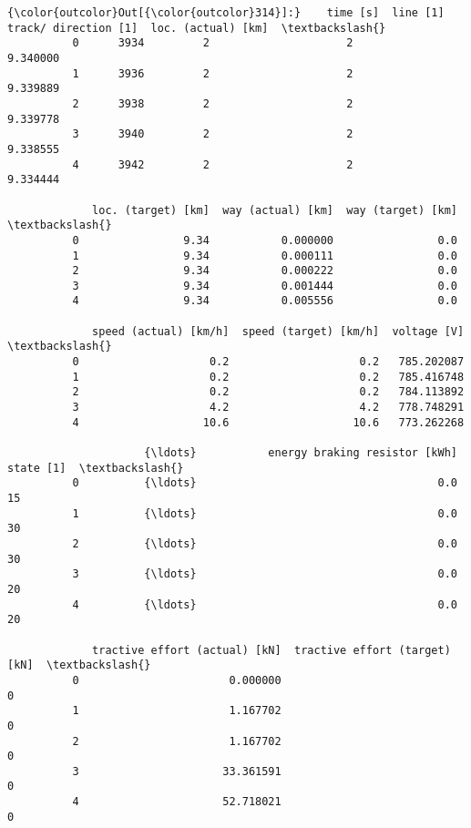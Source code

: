 \documentclass[11pt]{article}
\begin{document}
\begin{Verbatim}[commandchars=\\\{\}]
{\color{outcolor}Out[{\color{outcolor}314}]:}    time [s]  line [1]  track/ direction [1]  loc. (actual) [km]  \textbackslash{}
          0      3934         2                     2            9.340000   
          1      3936         2                     2            9.339889   
          2      3938         2                     2            9.339778   
          3      3940         2                     2            9.338555   
          4      3942         2                     2            9.334444   
          
             loc. (target) [km]  way (actual) [km]  way (target) [km]  \textbackslash{}
          0                9.34           0.000000                0.0   
          1                9.34           0.000111                0.0   
          2                9.34           0.000222                0.0   
          3                9.34           0.001444                0.0   
          4                9.34           0.005556                0.0   
          
             speed (actual) [km/h]  speed (target) [km/h]  voltage [V]  \textbackslash{}
          0                    0.2                    0.2   785.202087   
          1                    0.2                    0.2   785.416748   
          2                    0.2                    0.2   784.113892   
          3                    4.2                    4.2   778.748291   
          4                   10.6                   10.6   773.262268   
          
                     {\ldots}           energy braking resistor [kWh]  state [1]  \textbackslash{}
          0          {\ldots}                                     0.0         15   
          1          {\ldots}                                     0.0         30   
          2          {\ldots}                                     0.0         30   
          3          {\ldots}                                     0.0         20   
          4          {\ldots}                                     0.0         20   
          
             tractive effort (actual) [kN]  tractive effort (target) [kN]  \textbackslash{}
          0                       0.000000                              0   
          1                       1.167702                              0   
          2                       1.167702                              0   
          3                      33.361591                              0   
          4                      52.718021                              0   
          

\end{Verbatim}
\end{document}
